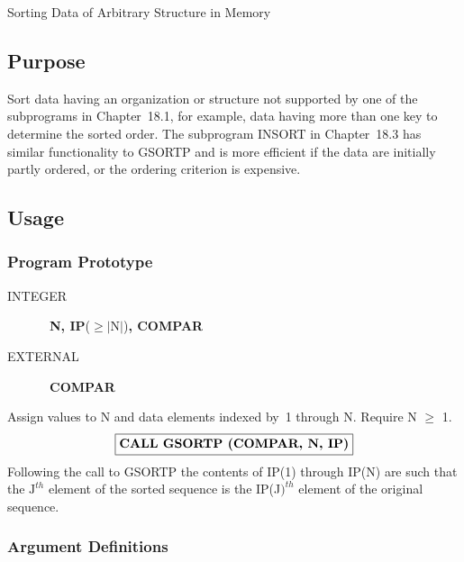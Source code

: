 \documentclass[twoside]{MATH77}
\begin{document}
  Sorting Data of Arbitrary Structure in Memory


\subsection{Purpose}

Sort data having an organization or structure not supported by one of the
subprograms in Chapter~18.1, for example, data having more than one key to
determine the sorted order. The subprogram INSORT in Chapter~18.3 has
similar functionality to GSORTP and is more efficient if the data are
initially partly ordered, or the ordering criterion is expensive.

\subsection{Usage}

\subsubsection{Program Prototype}

\begin{description}

\item[INTEGER] \ {\bf N, IP}($\geq |\text{N}|$){\bf , COMPAR}

\item[EXTERNAL] \ {\bf COMPAR}

\end{description}

Assign values to N and data elements indexed by~1 through N. Require
N $\geq $ 1.
$$
\fbox{\bf CALL GSORTP (COMPAR, N, IP)}
$$
Following the call to GSORTP the contents of IP(1) through IP(N) are such
that the $\text{J}^{th}$ element of the sorted sequence is the IP(J$)^{th}$ element
of the original sequence.

\subsubsection{Argument Definitions}
\end{document}
